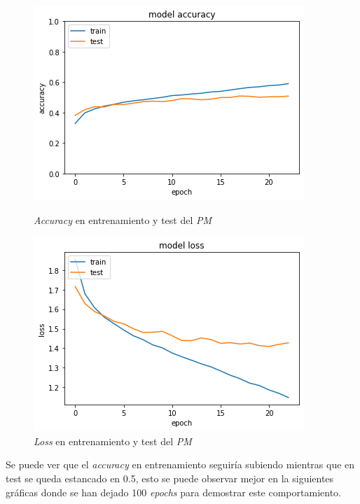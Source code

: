 \documentclass{uc3mpracticas}
\begin{document}
\begin{figure}[!h]
\centering
\begin{minipage}{.52\textwidth}
  \centering
  \includegraphics[width=.8\linewidth]{Images/accuracyPM.png}
  \caption*{\textit{Accuracy} en entrenamiento y test del \textit{PM}}
\end{minipage}%
\begin{minipage}{.52\textwidth}
  \centering
  \includegraphics[width=.8\linewidth]{Images/lossPM.png}
  \caption*{\textit{Loss} en entrenamiento y test del \textit{PM}}
\end{minipage}
\end{figure}

Se puede ver que el \textit{accuracy} en entrenamiento seguiría subiendo mientras que en test se queda estancado en 0.5, esto se puede observar mejor en la siguientes gráficas donde se han dejado 100 \textit{epochs} para demostrar este comportamiento.
\end{document}
